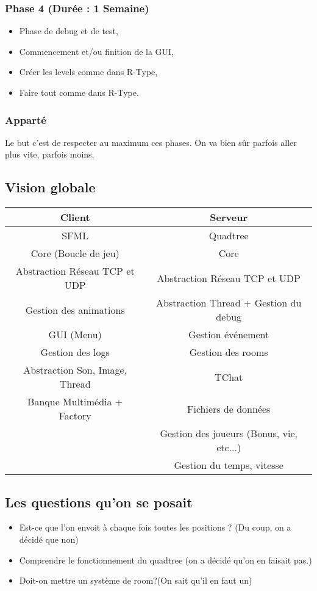 \documentclass{article}
\begin{document}
\subsubsection{Phase 4 (Durée : 1 Semaine)}
\begin{itemize}
  \item{Phase de debug et de test,}
  \item{Commencement et/ou finition de la GUI,}
  \item{Créer les levels comme dans R-Type,}
  \item{Faire tout comme dans R-Type.}
\end{itemize}
\subsubsection{Apparté}
Le but c'est de respecter au maximum ces phases. On va bien sûr parfois aller
plus vite, parfois moins.
\newpage
\subsection{Vision globale}
\begin{tabular}{| c | c |}
  \hline
  Client & Serveur \\ \hline
  SFML & Quadtree \\ \hline
  Core (Boucle de jeu) & Core \\ \hline
  Abstraction Réseau TCP et UDP & Abstraction Réseau TCP et UDP \\ \hline
  Gestion des animations & Abstraction Thread + Gestion du debug \\ \hline
  GUI (Menu) & Gestion événement \\ \hline
  Gestion des logs & Gestion des rooms \\ \hline
  Abstraction Son, Image, Thread & TChat \\ \hline
  Banque Multimédia + Factory & Fichiers de données \\ \hline
  & Gestion des joueurs (Bonus, vie, etc...) \\ \hline
  & Gestion du temps, vitesse \\ \hline
\end{tabular}
\subsection{Les questions qu'on se posait}
\begin{itemize}
  \item{Est-ce que l'on envoit à chaque fois toutes les positions ? (Du coup, on
      a décidé que non)}
  \item{Comprendre le fonctionnement du quadtree (on a décidé qu'on en faisait
      pas.)}
  \item{Doit-on mettre un système de room?(On sait qu'il en faut un)}
\end{itemize}
\newpage
\end{document}
